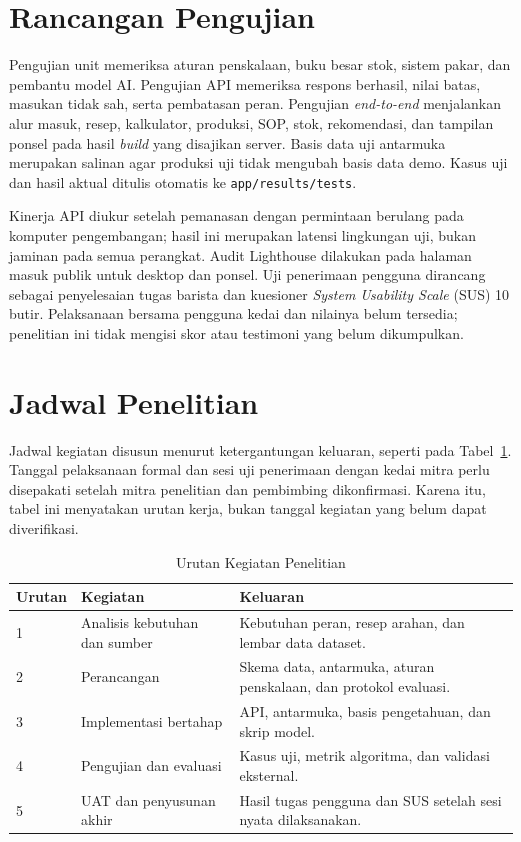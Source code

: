 \section{Rancangan Pengujian}
\label{sec:rancangan-pengujian}

Pengujian unit memeriksa aturan penskalaan, buku besar stok, sistem pakar, dan pembantu model AI. Pengujian API memeriksa respons berhasil, nilai batas, masukan tidak sah, serta pembatasan peran. Pengujian \textit{end-to-end} menjalankan alur masuk, resep, kalkulator, produksi, SOP, stok, rekomendasi, dan tampilan ponsel pada hasil \textit{build} yang disajikan server. Basis data uji antarmuka merupakan salinan agar produksi uji tidak mengubah basis data demo. Kasus uji dan hasil aktual ditulis otomatis ke \texttt{app/results/tests}.

Kinerja API diukur setelah pemanasan dengan permintaan berulang pada komputer pengembangan; hasil ini merupakan latensi lingkungan uji, bukan jaminan pada semua perangkat. Audit Lighthouse dilakukan pada halaman masuk publik untuk desktop dan ponsel. Uji penerimaan pengguna dirancang sebagai penyelesaian tugas barista dan kuesioner \textit{System Usability Scale} (SUS) 10 butir. Pelaksanaan bersama pengguna kedai dan nilainya belum tersedia; penelitian ini tidak mengisi skor atau testimoni yang belum dikumpulkan.

\section{Jadwal Penelitian}
\label{sec:jadwal}

Jadwal kegiatan disusun menurut ketergantungan keluaran, seperti pada Tabel~\ref{tab:jadwal}. Tanggal pelaksanaan formal dan sesi uji penerimaan dengan kedai mitra perlu disepakati setelah mitra penelitian dan pembimbing dikonfirmasi. Karena itu, tabel ini menyatakan urutan kerja, bukan tanggal kegiatan yang belum dapat diverifikasi.

\begin{table}[htbp]
\centering
\caption{Urutan Kegiatan Penelitian}
\label{tab:jadwal}
\begin{tabular}{p{}p{}p{}}
\toprule
Urutan & Kegiatan & Keluaran \\
\midrule
1 & Analisis kebutuhan dan sumber & Kebutuhan peran, resep arahan, dan lembar data dataset. \\
2 & Perancangan & Skema data, antarmuka, aturan penskalaan, dan protokol evaluasi. \\
3 & Implementasi bertahap & API, antarmuka, basis pengetahuan, dan skrip model. \\
4 & Pengujian dan evaluasi & Kasus uji, metrik algoritma, dan validasi eksternal. \\
5 & UAT dan penyusunan akhir & Hasil tugas pengguna dan SUS setelah sesi nyata dilaksanakan. \\
\bottomrule
\end{tabular}
\end{table}
